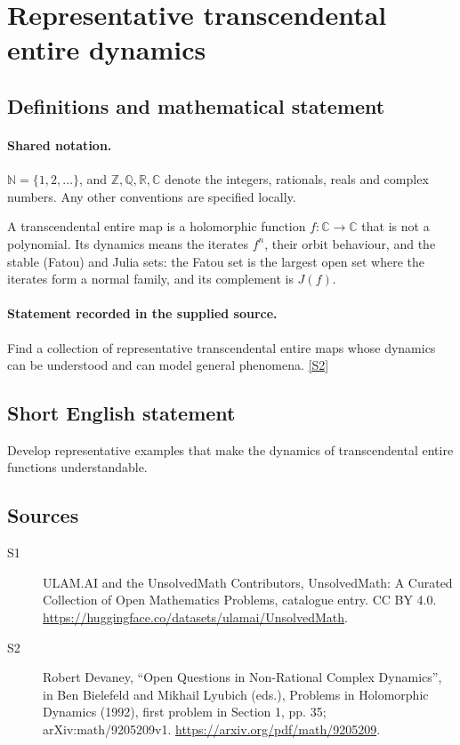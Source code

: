 \documentclass[11pt]{article}
\newcommand{\sref}[2]{\hyperlink{source:#1:#2}{[S#2]}}
\begin{document}
\section{Representative transcendental entire dynamics}\label{statement}

\subsection{Definitions and mathematical statement}

\paragraph{Shared notation.}$\mathbb N=\{1,2,\ldots\}$, and $\mathbb Z,\mathbb Q,\mathbb R,\mathbb C$ denote the integers, rationals, reals and complex numbers. Any other conventions are specified locally.


A transcendental entire map is a holomorphic function $f:\mathbb C\to\mathbb C$ that is not a polynomial. Its dynamics means the iterates $f^n$, their orbit behaviour, and the stable (Fatou) and Julia sets: the Fatou set is the largest open set where the iterates form a normal family, and its complement is $J(f)$.
\paragraph{Statement recorded in the supplied source.}
Find a collection of representative transcendental entire maps whose dynamics can be understood and can model general phenomena. \sref{statement}{2}
\subsection{Short English statement}
Develop representative examples that make the dynamics of transcendental entire functions understandable.
\subsection{Sources}
\begin{description}
\item[\hypertarget{source:statement:1}{S1}] ULAM.AI and the UnsolvedMath Contributors, UnsolvedMath: A Curated Collection of Open Mathematics Problems, catalogue entry. CC BY 4.0. \url{https://huggingface.co/datasets/ulamai/UnsolvedMath}.
\item[\hypertarget{source:statement:2}{S2}] Robert Devaney, ``Open Questions in Non-Rational Complex Dynamics'', in Ben Bielefeld and Mikhail Lyubich (eds.), Problems in Holomorphic Dynamics (1992), first problem in Section 1, pp. 35; arXiv:math/9205209v1. \url{https://arxiv.org/pdf/math/9205209}.
\end{description}
\label{end:statement}
\end{document}
